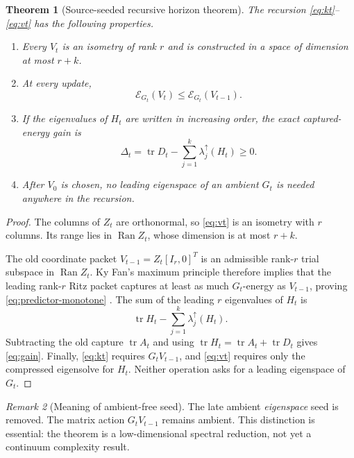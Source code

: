 \documentclass[11pt]{article}
\newtheorem{theorem}{Theorem}[section]
\theoremstyle{definition}
\theoremstyle{remark}
\newtheorem{remark}[theorem]{Remark}
\newcommand{\tr}{\operatorname{tr}}
\newcommand{\Ran}{\operatorname{Ran}}
\newcommand{\E}{\mathcal E}
\begin{document}
\begin{theorem}[Source-seeded recursive horizon theorem]
\label{thm:horizon}
The recursion \eqref{eq:kt}--\eqref{eq:vt} has the following properties.
\begin{enumerate}[leftmargin=2em]
\item Every $V_t$ is an isometry of rank $r$ and is constructed in a space of
dimension at most $r+k$.
\item At every update,
\begin{equation}
 \E_{G_t}(V_t)\le \E_{G_t}(V_{t-1}).
 \label{eq:predictor-monotone}
\end{equation}
\item If the eigenvalues of $H_t$ are written in increasing order, the exact
captured-energy gain is
\begin{equation}
 \Delta_t
 =\tr D_t-\sum_{j=1}^k\lambda_j^\uparrow(H_t)\ge0.
 \label{eq:gain}
\end{equation}
\item After $V_0$ is chosen, no leading eigenspace of an ambient $G_t$ is
needed anywhere in the recursion.
\end{enumerate}
\end{theorem}

\begin{proof}
The columns of $Z_t$ are orthonormal, so \eqref{eq:vt} is an isometry with
$r$ columns.  Its range lies in $\Ran Z_t$, whose dimension is at most
$r+k$.

The old coordinate packet $V_{t-1}=Z_t[I_r,0]^T$ is an admissible rank-$r$
trial subspace in $\Ran Z_t$.  Ky Fan's maximum principle therefore implies
that the leading rank-$r$ Ritz packet captures at least as much $G_t$-energy
as $V_{t-1}$, proving \eqref{eq:predictor-monotone}
\citep{Fan1949,Bhatia1997}.  The sum of the leading $r$ eigenvalues of $H_t$
is
\[
 \tr H_t-\sum_{j=1}^k\lambda_j^\uparrow(H_t).
\]
Subtracting the old capture $\tr A_t$ and using
$\tr H_t=\tr A_t+\tr D_t$ gives \eqref{eq:gain}.  Finally,
\eqref{eq:kt} requires $G_tV_{t-1}$, and \eqref{eq:vt} requires only the
compressed eigensolve for $H_t$.  Neither operation asks for a leading
eigenspace of $G_t$.
\end{proof}

\begin{remark}[Meaning of ambient-free seed]
The late ambient \emph{eigenspace} seed is removed.  The matrix action
$G_tV_{t-1}$ remains ambient.  This distinction is essential: the theorem is
a low-dimensional spectral reduction, not yet a continuum complexity result.
\end{remark}
\end{document}
